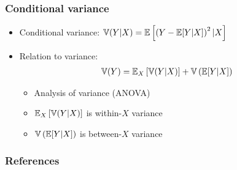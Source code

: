 \begin{frame} \frametitle{Conditional variance}
  \begin{itemize}
  \item \alert{Conditional variance}: $\mathbb{V}(Y|X)= \mathbb{E}\left[ \left(Y -
        \mathbb{E}[Y|X] \right)^2 | X \right]$
  \item Relation to variance:
    \begin{align*}
      \mathbb{V}(Y) = \mathbb{E}_X\left[ \mathbb{V}(Y|X)  \right] + \mathbb{V}\left( \mathbb{E}[Y | X]
      \right)
    \end{align*}
    \begin{itemize}
    \item Analysis of variance (ANOVA)
    \item $\mathbb{E}_X\left[ \mathbb{V}(Y|X)  \right]$ is within-$X$ variance
    \item $\mathbb{V}\left( \mathbb{E}[Y|X]  \right)$ is between-$X$ variance
    \end{itemize}
  \end{itemize}

\end{frame}


\begin{frame}[allowframebreaks]
  \frametitle{References}
 

\end{frame}


